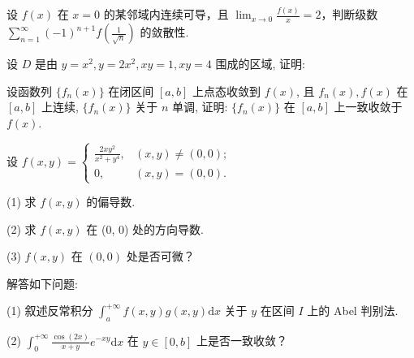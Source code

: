 设 $f(x)$ 在 $x = 0$ 的某邻域内连续可导，且 $\lim_{x \to 0} \frac{f(x)}{x} = 2$，判断级数 $\sum_{n=1}^{\infty} (-1)^{n+1} f\left(\frac{1}{\sqrt{n}}\right)$ 的敛散性.\par
\par{}
设 $D$ 是由 $y = x^{2}, y = 2x^{2}, xy = 1, xy = 4$ 围成的区域, 证明:\par
\nopagebreak[4]
设函数列 $\{f_n(x)\}$ 在闭区间 $[a, b]$ 上点态收敛到 $f(x)$, 且 $f_n(x), f(x)$ 在 $[a, b]$ 上连续, $\{f_n(x)\}$ 关于 $n$ 单调, 证明: $\{f_n(x)\}$ 在 $[a, b]$ 上一致收敛于 $f(x)$.\par
设 $f(x, y) = \begin{cases} \frac{2xy^2}{x^2 + y^4}, & (x, y) \neq (0, 0); \\ 0, & (x, y) = (0, 0). \end{cases}$\par
(1) 求 $f(x, y)$ 的偏导数.\par
(2) 求 $f(x, y)$ 在 (0, 0) 处的方向导数.\par
(3) $f(x,y)$ 在 $(0,0)$ 处是否可微？\par
解答如下问题:\par
(1) 叙述反常积分 $\int_{a}^{+\infty} f(x, y) g(x, y) \mathrm{d}x$ 关于 $y$ 在区间 $I$ 上的 Abel 判别法.\par
(2) $\int_0^{+\infty}\frac{\cos(2x)}{x + y} e^{-xy}\mathrm{d}x$ 在 $y\in [0,b]$ 上是否一致收敛？\par
